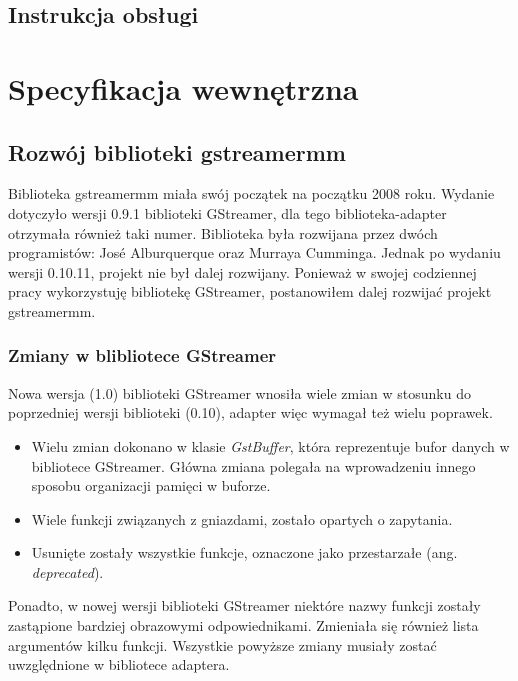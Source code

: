 \documentclass[12pt]{article}
\begin{document}
\subsection{Instrukcja obsługi}
\cleardoublepage
\section{Specyfikacja wewnętrzna}
\subsection{Rozwój biblioteki gstreamermm}
Biblioteka gstreamermm miała swój początek na początku 2008 roku. Wydanie dotyczyło wersji 0.9.1 biblioteki GStreamer, dla tego biblioteka-adapter otrzymała również taki numer. Biblioteka była rozwijana przez dwóch programistów: José Alburquerque oraz Murraya Cumminga. Jednak po wydaniu wersji 0.10.11, projekt nie był dalej rozwijany. Ponieważ w swojej codziennej pracy wykorzystuję bibliotekę GStreamer, postanowiłem dalej rozwijać projekt gstreamermm.
\subsubsection{Zmiany w blibliotece GStreamer}
Nowa wersja (1.0) biblioteki GStreamer wnosiła wiele zmian w stosunku do poprzedniej wersji biblioteki (0.10), adapter więc wymagał też wielu poprawek. 
\begin{itemize}
 \setlength{\itemsep}{0em}
  \item Wielu zmian dokonano w klasie \textit{GstBuffer}, która reprezentuje bufor danych w bibliotece GStreamer. Główna zmiana polegała na wprowadzeniu innego sposobu organizacji pamięci w buforze.
  \item Wiele funkcji związanych z gniazdami, zostało opartych o zapytania.
  \item Usunięte zostały wszystkie funkcje, oznaczone jako przestarzałe (ang. \textit{deprecated}).
\end{itemize}
Ponadto, w nowej wersji biblioteki GStreamer niektóre nazwy funkcji zostały zastąpione bardziej obrazowymi odpowiednikami. Zmieniała się również lista argumentów kilku funkcji.
Wszystkie powyższe zmiany musiały zostać uwzględnione w bibliotece adaptera.
\end{document}

